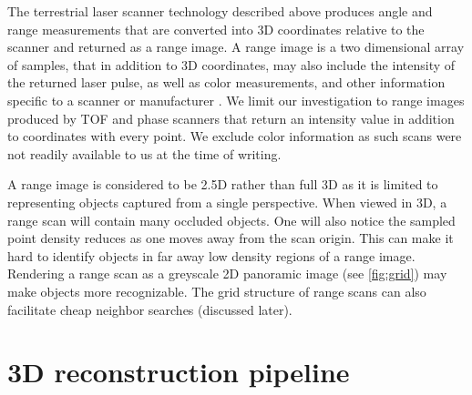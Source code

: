 The terrestrial laser scanner technology described above produces angle and range measurements that are converted into 3D coordinates relative to the scanner and returned as a range image. A range image is a two dimensional array of samples, that in addition to 3D coordinates, may also include the intensity of the returned laser pulse, as well as color measurements, and other information specific to a scanner or manufacturer \cite{Frohlich2004}. We limit our investigation to range images produced by TOF and phase scanners that return an intensity value in addition to coordinates with every point. We exclude color information as such scans were not readily available to us at the time of writing.

A range image is considered to be 2.5D rather than full 3D as it is limited to representing objects captured from a single perspective. When viewed in 3D, a range scan will contain many occluded objects. One will also notice the sampled point density reduces as one moves away from the scan origin. This can make it hard to identify objects in far away low density regions of a range image. Rendering a range scan as a greyscale 2D panoramic image (see \autoref{fig:grid}) may make objects more recognizable. The grid structure of range scans can also facilitate cheap neighbor searches (discussed later).

\section{3D reconstruction pipeline} \label{sec:pipeline}


